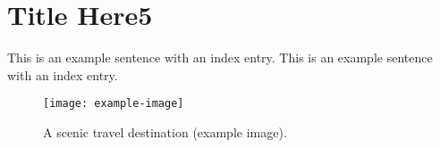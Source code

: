 \newpage
\chapter{Title Here5}
This is an example sentence with an index entry.
This is an example sentence with an index entry.
\lipsum[1]  %
\begin{figure}[htbp]
  \centering
  \texttt{[image: example-image]} %
  \caption{A scenic travel destination (example image).}
\end{figure}
\lipsum[1]  %
\lipsum[2]  %




